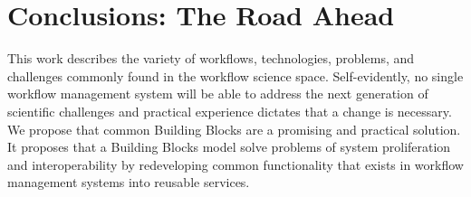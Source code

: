 \section{Conclusions: The Road Ahead}

This work describes the variety of workflows, technologies, problems, and
challenges commonly found in the workflow science space.  Self-evidently, no
single workflow management system will be able to address the next generation
of scientific challenges and practical experience dictates that a change is
necessary. We propose  that common Building Blocks are a promising and
practical solution. It proposes that a Building Blocks model solve problems of
system proliferation and interoperability by redeveloping common functionality
that exists in workflow management systems into reusable services.



